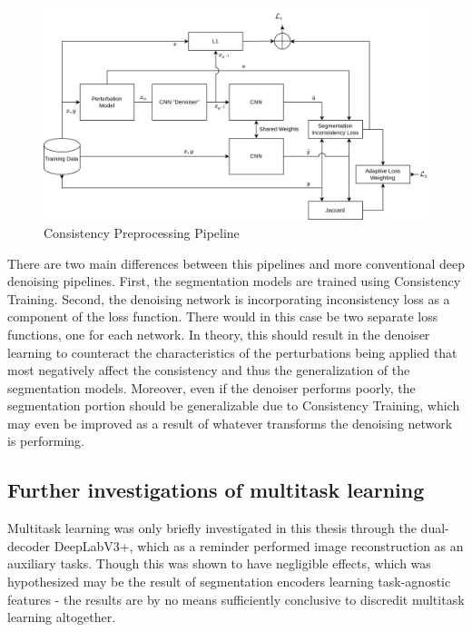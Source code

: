         \begin{figure}[htb]
            \centering
           \includegraphics[width=\linewidth]{illustrations/deep_preprocessing.png}
            \caption{Consistency Preprocessing Pipeline}
            \label{fig:preproc}
        \end{figure}
        
        There are two main differences between this pipelines and more conventional deep denoising pipelines. First, the segmentation models are trained using Consistency Training. Second, the denoising network is incorporating inconsistency loss as a component of the loss function. There would in this case be two separate loss functions, one for each network. In theory, this should result in the denoiser learning to counteract the characteristics of the perturbations being applied that most negatively affect the consistency and thus the generalization of the segmentation models. Moreover, even if the denoiser performs poorly, the segmentation portion should be generalizable due to Consistency Training, which may even be improved as a result of whatever transforms the denoising network is performing.
        
        
    \subsection{Further investigations of multitask learning}
        Multitask learning was only briefly investigated in this thesis through the dual-decoder DeepLabV3+, which as a reminder performed image reconstruction as an auxiliary tasks. Though this was shown to have negligible effects, which was hypothesized may be the result of segmentation encoders learning task-agnostic features - the results are by no means sufficiently conclusive to discredit multitask learning altogether. 
    
